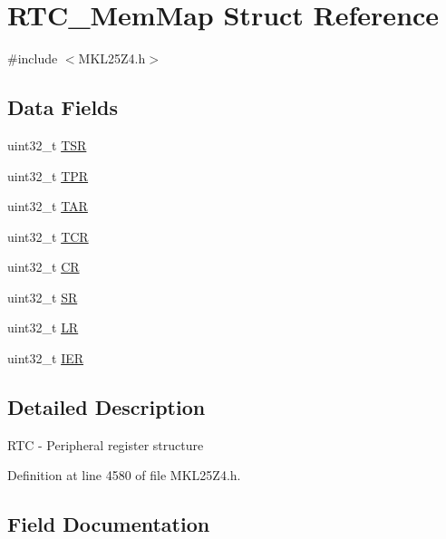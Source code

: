 \hypertarget{struct_r_t_c___mem_map}{}\section{R\+T\+C\+\_\+\+Mem\+Map Struct Reference}
\label{struct_r_t_c___mem_map}


{\ttfamily \#include $<$M\+K\+L25\+Z4.\+h$>$}

\subsection*{Data Fields}
\begin{DoxyCompactItemize}
\item 
uint32\+\_\+t \hyperlink{struct_r_t_c___mem_map_a4ca4d2878d99736cbff0e8b107a275f2}{T\+SR}
\item 
uint32\+\_\+t \hyperlink{struct_r_t_c___mem_map_a32641b62d548255bdf2164b457a2aaeb}{T\+PR}
\item 
uint32\+\_\+t \hyperlink{struct_r_t_c___mem_map_a500ab794376810b97e2b2e01658f330c}{T\+AR}
\item 
uint32\+\_\+t \hyperlink{struct_r_t_c___mem_map_ab816b0540497796070202cd2f5bc10ed}{T\+CR}
\item 
uint32\+\_\+t \hyperlink{struct_r_t_c___mem_map_a05c71be888cd40a4d91c631260d684d7}{CR}
\item 
uint32\+\_\+t \hyperlink{struct_r_t_c___mem_map_a82faed2f609de35e3b27d5fd27ba82e2}{SR}
\item 
uint32\+\_\+t \hyperlink{struct_r_t_c___mem_map_a6d1b4fe68ed53926b57392e7ad582469}{LR}
\item 
uint32\+\_\+t \hyperlink{struct_r_t_c___mem_map_a1db69b589f5bfc5faa12b9c54e7c8061}{I\+ER}
\end{DoxyCompactItemize}


\subsection{Detailed Description}
R\+TC -\/ Peripheral register structure 

Definition at line 4580 of file M\+K\+L25\+Z4.\+h.



\subsection{Field Documentation}
